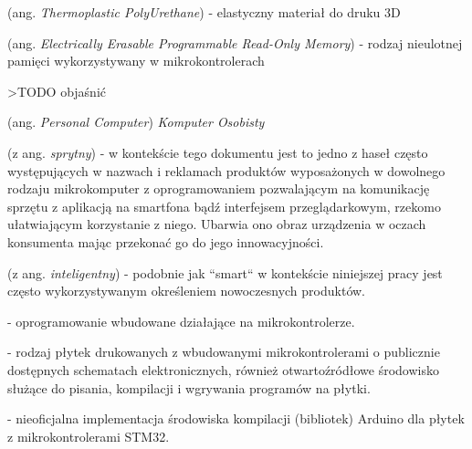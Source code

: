 \begin{description}[labelwidth=*]
  \item [TPU] (ang. \emph{Thermoplastic PolyUrethane}) - elastyczny materiał do druku 3D
  
  \item [EEPROM] (ang. \emph{Electrically Erasable Programmable Read-Only Memory}) - rodzaj nieulotnej pamięci wykorzystywany w mikrokontrolerach
  
  \item [MEMS] >TODO objaśnić
  
  \item [PC] (ang. \emph{Personal Computer}) \emph{Komputer Osobisty}
  
  \item [smart] (z ang. \emph{sprytny})  - w kontekście tego dokumentu jest to jedno z haseł często występujących w nazwach i reklamach produktów wyposażonych w dowolnego rodzaju mikrokomputer z oprogramowaniem pozwalającym na komunikację sprzętu z aplikacją na smartfona bądź interfejsem przeglądarkowym, rzekomo ułatwiającym korzystanie z niego. Ubarwia ono obraz urządzenia w oczach konsumenta mając przekonać go do jego innowacyjności. 
  
  \item [intelligent] (z ang. \emph{inteligentny})  - podobnie jak ``smart`` w kontekście niniejszej pracy jest często wykorzystywanym określeniem nowoczesnych produktów.
  
  \item [Firmware] - oprogramowanie wbudowane działające na mikrokontrolerze.
  
  \item [Arduino] - rodzaj płytek drukowanych\cite{arduino-boards} z wbudowanymi mikrokontrolerami o publicznie dostępnych schematach elektronicznych, również otwartoźródłowe środowisko służące do pisania, kompilacji i wgrywania programów na płytki.
  
  \item [STM32duino] - nieoficjalna implementacja środowiska kompilacji (bibliotek) Arduino dla płytek z mikrokontrolerami STM32.
  
\end{description}
